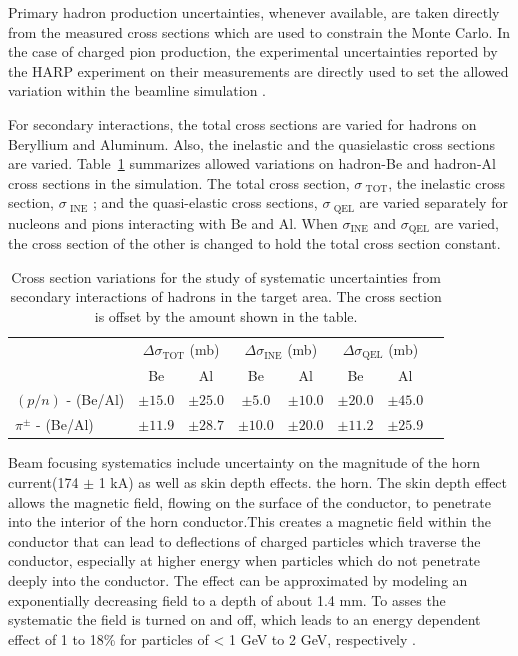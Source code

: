 Primary hadron production uncertainties, whenever available, are taken directly from the
measured cross sections which are used to constrain the Monte Carlo. In the case
of charged pion production, the experimental uncertainties reported by the HARP experiment on
their measurements are directly used to set the allowed variation within the beamline simulation \cite{Catanesi:2007ab}.

For secondary interactions, the total cross sections are varied for hadrons on Beryllium and Aluminum.  Also, the inelastic and the quasielastic cross sections are varied.  Table~\ref{tab:flux_secondary_int_variations} summarizes allowed variations on hadron-Be and hadron-Al cross sections in the simulation. The total cross section, $\sigma_{\text{~TOT}}$, the inelastic cross section, $\sigma_{\text{~INE}}$ ; and the quasi-elastic cross sections, $\sigma_{\text{~QEL}}$ are varied separately for nucleons and pions interacting with Be and Al. When $\sigma_{\text{INE}}$ and $\sigma_{\text{QEL}}$ are varied, the cross section of the other is changed to hold the total cross section constant.

\begin{table}[h]
  \caption[BNB Secondary Interaction Variations]{Cross section variations for the study of systematic uncertainties from secondary interactions of hadrons in the target area.  The cross section is offset by the amount shown in the table.}
  \label{tab:flux_secondary_int_variations}
  \centering
  \begin{tabular}{l|ccccccc}
  \hline
  \hline
   &  \multicolumn{2}{c}{$\Delta \sigma_{\text{TOT}}$ (mb)} & \multicolumn{2}{c}{$\Delta \sigma_{\text{INE}}$ (mb)} & \multicolumn{2}{c}{$\Delta \sigma_{\text{QEL}}$ (mb)} \\
   &  Be & Al & Be & Al & Be & Al \\
  \hline
   $(p/n)$ - (Be/Al) & $\pm 15.0$ & $\pm 25.0$ & $\pm 5.0$ & $\pm 10.0$ & $\pm 20.0$ & $\pm 45.0$ \\
   $\pi^{\pm}$ - (Be/Al) & $\pm 11.9$ & $\pm 28.7$ & $\pm 10.0$ & $\pm 20.0$ & $\pm 11.2$ & $\pm 25.9$ \\
  \hline
  \end{tabular}
\end{table}

Beam focusing systematics include uncertainty on the magnitude of the horn current(174 $\pm$ 1 kA) as well as skin depth effects. the horn. The skin depth effect allows the magnetic field, flowing on the surface of the conductor, to penetrate into the interior of the horn conductor.This creates a magnetic field within the conductor that can lead to deflections of charged particles which traverse the conductor, especially at higher energy  when particles which do not penetrate deeply into the conductor. The effect can be approximated by modeling an exponentially decreasing field to a depth of about 1.4 mm. To asses the systematic the field is turned on and off, which leads to an energy dependent effect of 1 to 18\% for particles of < 1 GeV to 2 GeV, respectively \cite{AguilarArevalo:2008yp}.

